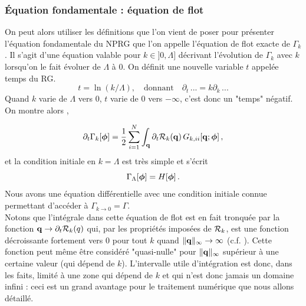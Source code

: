 \documentclass[10.5pt]{article}
\begin{document}
\begin{multicols*}{2}
\subsubsection{Équation fondamentale : équation de flot}

On peut alors utiliser les définitions que l'on vient de poser pour présenter l'équation fondamentale du NPRG que l'on appelle l'équation de flot exacte de $\Gamma_k$. Il s'agit d'une équation valable pour $k \in ]0, \Lambda]$ décrivant l'évolution de $\Gamma_k$ avec $k$ lorsqu'on le fait évoluer de $\Lambda$ à $0$. On définit une nouvelle variable $t$ appelée temps du RG.
\begin{equation}
	t = \ln(k/\Lambda), \quad \text{donnant} \quad \partial_t \, ... = k\partial_k \, ...
\end{equation}
Quand $k$ varie de $\Lambda$ vers $0$, $t$ varie de $0$ vers $-\infty$, c'est donc un "temps" négatif. On montre alors \cite{Delamotte2012},

\begin{equation}
\partial_t \Gamma_{k}	[\boldsymbol{ \phi}] = \frac{1}{2} \sum\limits_{i=1}^{N} \int_{\bf q} \partial_t \mathcal{R}_k({\bf q}) \, G_{k, ii}[{\bf q}; \boldsymbol{ \phi}] \, ,
	\label{eq:flot}
\end{equation}
et la condition initiale en $k = \Lambda$ est très simple et s'écrit
\begin{equation}
	\Gamma_\Lambda [\boldsymbol{ \phi}] = H[\boldsymbol{ \phi}] \, .
	\label{eq:initFlotBMW}
\end{equation}
Nous avons une équation différentielle avec une condition initiale connue permettant d'accéder à $\Gamma_{k \to 0} = \Gamma$. \\

Notons que l'intégrale dans cette équation de flot est en fait tronquée par la fonction ${\bf q} \to \partial_t \mathcal{R}_k(q)$ qui, par les propriétés imposées de $\mathcal{R}_k$, est une fonction décroissante fortement vers $0$ pour tout $k$ quand $\|{\bf q}\|_\infty \to \infty$ (c.f. ). Cette fonction peut même être considéré "quasi-nulle" pour $\|{\bf q}\|_\infty$ supérieur à une certaine valeur (qui dépend de $k$).  L'intervalle utile d'intégration est donc, dans les faits, limité à une zone qui dépend de $k$ et qui n'est donc jamais un domaine infini : ceci est un grand avantage pour le traitement numérique que nous allons détaillé. \\


\end{multicols*}
\end{document}
